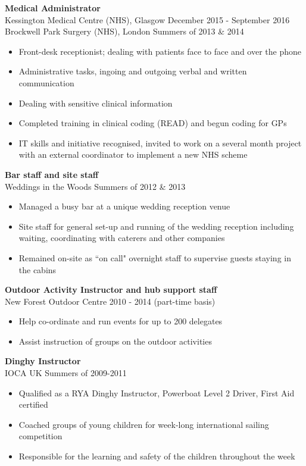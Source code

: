 \documentclass[margin, line, 10pt]{res} %
\begin{document}
\begin{resume}
\textbf{Medical Administrator} \\
Kessington Medical Centre (NHS), Glasgow \hfill December 2015 - September 2016\\
Brockwell Park Surgery (NHS), London \hfill Summers of 2013 \& 2014 \\
\begin{itemize} \itemsep -2pt %
\item Front-desk receptionist; dealing with patients face to face and over the phone
\item Administrative tasks, ingoing and outgoing verbal and written communication
\item Dealing with sensitive clinical information
\item Completed training in clinical coding (READ) and begun coding for GPs
\item IT skills and initiative recognised, invited to work on a several month project with an external coordinator to implement a new NHS scheme
\end{itemize}
 
\textbf{Bar staff and site staff} \\
Weddings in the Woods \hfill Summers of 2012 \& 2013 \\
\begin{itemize} 
\item Managed a busy bar at a unique wedding reception venue
\item Site staff for general set-up and running of the wedding reception including waiting, coordinating with caterers and other companies
\item Remained on-site as ``on call" overnight staff to supervise guests staying in the cabins    
\end{itemize} 

\textbf{Outdoor Activity Instructor and hub support staff} \\
New Forest Outdoor Centre \hfill 2010 - 2014 (part-time basis) \\
\begin{itemize} 
\item Help co-ordinate and run events for up to 200 delegates
\item Assist instruction of groups on the outdoor activities    
\end{itemize} 

\textbf{Dinghy Instructor} \\
IOCA UK \hfill Summers of 2009-2011 \\
\begin{itemize} 
\item Qualified as a RYA Dinghy Instructor, Powerboat Level 2 Driver, First Aid certified
\item Coached groups of young children for week-long international sailing competition 
\item Responsible for the learning and safety of the children throughout the week
\end{itemize} 



\end{resume}
\end{document}
